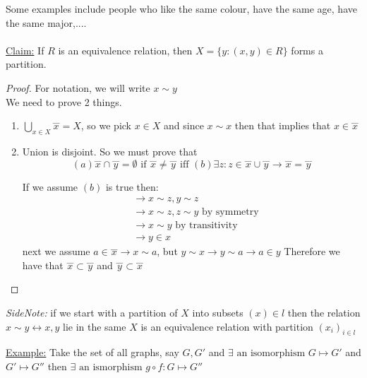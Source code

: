 \documentclass[12pt]{article}
\begin{document}
Some examples include people who like the same colour, have the same age, have the same major,....\\
\\
\underline{Claim:} If $R$ is an equivalence relation, then $X = \{ y : (x,y) \in R \}$ forms a partition.

\begin{proof}
	For notation, we will write $x \sim y$\\
	We need to prove 2 things.\\
	\begin{enumerate}
		\item{$\bigcup_{x\in X} \overset{\_\_\_}{x} = X$}, so we pick $x \in X$ and since $x \sim x$ then that implies that $x \in \overset{\_\_\_}{x}$
		\item{
			Union is disjoint. So we must prove that
			$$(a) \overset{\_\_\_}{x} \cap \overset{\_\_\_}{y} = \emptyset \text{ if } \overset{\_\_\_}{x} \neq \overset{\_\_\_}{y} \text{ iff } (b) \exists z : z\in \overset{\_\_\_}{x} \cup \overset{\_\_\_}{y} \rightarrow \overset{\_\_\_}{x} = \overset{\_\_\_}{y}$$
			
			If we assume $(b)$ is true then:
			\begin{align*}
				&\rightarrow x\sim z, y\sim z\\
				&\rightarrow x\sim z, z\sim y \text{ by symmetry}\\
				&\rightarrow x\sim y \text{ by transitivity}\\
				&\rightarrow y \in x
			\end{align*}
			next we assume $a\in\overset{\_\_\_}{x} \rightarrow x\sim a$, but $y\sim x \rightarrow y\sim a \rightarrow a \in y$
			Therefore we have that $\overset{\_\_\_}{x} \subset \overset{\_\_\_}{y}$ and $\overset{\_\_\_}{y} \subset \overset{\_\_\_}{x}$
		}
	\end{enumerate}
\end{proof}

\begin{tcolorbox}
	\textit{SideNote:} if we start with a partition of $X$ into subsets $(x)\in l $ then the relation $x\sim
y \leftrightarrow x,y$ lie in the same $X$ is an equivalence relation with partition $(x_i)_{i\in l}$
\end{tcolorbox}

\underline{Example:} Take the set of all graphs, say $G,G'$ and $\exists \text{ an isomorphism } G \mapsto G' $ and $G' \mapsto G''$ then $\exists \text{ an ismorphism }  g \circ f : G \mapsto G''$
\end{document}
